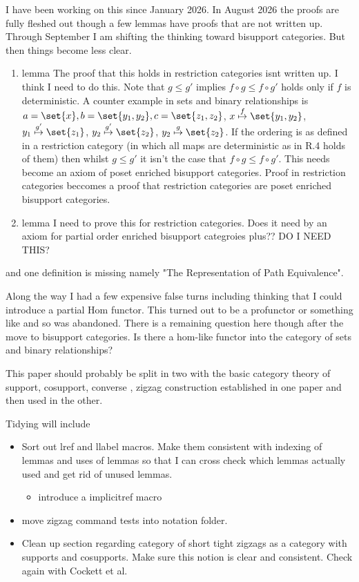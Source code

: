 \begin{aside}
I have been working on this since January 2026.
In August 2026 the proofs are fully fleshed out though a few lemmas have proofs that are not written up. Through September I am shifting the thinking toward bisupport categories. But then things become less clear.
\begin{enumerate}
  \item lemma   
  The proof that this holds in restriction categories isnt written up. 
  I think I need to do this. 
  Note that $g \leq g'$ implies $f \circ g \leq f \circ g'$ holds only if $f$ is deterministic. A counter example in sets and binary relationships is
  $a = \set{x}, b= \set{y_1,y_2}, c = \set{z_1,z_2}$, 
  $x \mathrel{\overset{f}{\mapsto}} \set{y_1,y_2}$,
  $y_1 \mathrel{\overset{g'}{\mapsto}} \set{z_1}$, 
  $y_2 \mathrel{\overset{g'}{\mapsto}} \set{z_2}$,
  $y_2 \mathrel{\overset{g}{\mapsto}} \set{z_2}$.
  If the ordering is as defined in a restriction category (in which all maps are deterministic as in R.4 holds of them) then whilst $g \leq g'$  it isn't the case that $f \circ g \leq f \circ g'$.
  This needs become an axiom of poset enriched bisupport categories. Proof in
  restriction categories beccomes a proof that restriction categories are poset enriched bisupport categories.
  \item lemma 
  I need to prove this for restriction categories. Does it need by an axiom for
  partial order enriched bisupport categroies plus??  DO I NEED THIS?
\end{enumerate}
and one definition is missing namely "The Representation of Path Equivalence".

Along the way I had a few expensive false turns including thinking that I could introduce a partial Hom functor. 
This turned out to be a profunctor or something like and so was abandoned.
There is a remaining question here though after the move to bisupport categories. Is there a hom-like functor into the category of sets and binary relationships?

This paper should probably be split in two with the basic category theory 
of support, cosupport, converse , zigzag construction established in one paper and then used in the other.

Tidying will include
\begin{itemize}
\item Sort out lref and llabel macros. Make them consistent with
indexing of lemmas and uses of lemmas so that I can cross check which lemmas actually used and get rid of unused lemmas.
\begin{itemize}
  \item introduce a implicitref macro
\end{itemize}
\item move zigzag command tests into notation folder.
\item Clean up section regarding category of short tight zigzags as a category with supports and cosupports. Make sure this notion is clear and consistent. Check again with Cockett et al.
\end{itemize}
\end{aside}
